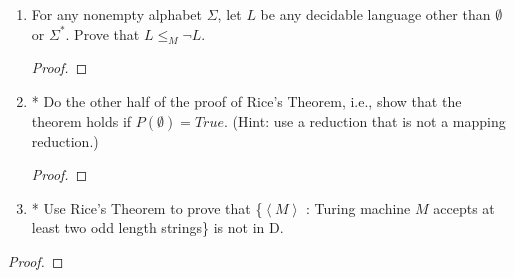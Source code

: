 \documentclass[10pt]{article}
\newcommand{\brackets}[1]{\left< #1 \right>}
\begin{document}
\begin{enumerate}[1)]

\item
For any nonempty alphabet $\Sigma$, let $L$ be any decidable language other than $\emptyset$ or $\Sigma ^*$. Prove that $L \leq _M \lnot L$.
\begin{proof}[Proof]
\end{proof}



\item
* Do the other half of the proof of Rice's Theorem, i.e., show that the theorem holds if $P(\emptyset) = True$. (Hint: use a reduction that is not a mapping reduction.)
\begin{proof}[Proof]
\end{proof}


\item
* Use Rice's Theorem to prove that \{$\brackets{M}$ : Turing machine $M$ accepts at least two odd length strings\} is not in D.
\end{enumerate}
\begin{proof}[Proof]
\end{proof}
\end{document}
